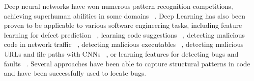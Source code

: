 \documentclass[
	a4paper,
	pagesize,
	pdftex,
	12pt,
	twoside, %
	BCOR=5mm, %
	ngerman,
	fleqn,
	final,
	]{scrartcl}
\begin{document}
Deep neural networks have won numerous pattern recognition competitions, achieving superhuman abilities in some domains ~\cite{Schmidhuber.2015}. Deep Learning has also been proven to be applicable to various software engineering tasks, including feature learning for defect prediction ~\cite{Wang.2016}, learning code suggestions ~\cite{Bhoopchand.2016}, detecting malicious code in network traffic ~\cite{Elovici.2007}, detecting malicious executables ~\cite{Schultz.2000}, detecting malicious URLs and file paths with CNNs ~\cite{Saxe.2017}, or learning features for detecting bugs and faults ~\cite{Huo.2016,Gupta.2017b}. Several approaches have been able to capture structural patterns in code \cite{Dam.2016} and have been successfully used to locate bugs\cite{Huo.2016,Russell.2018}.\\
\end{document}
